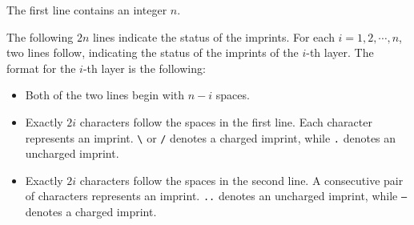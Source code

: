 The first line contains an integer $n$.

The following $2n$ lines indicate the status of the imprints.
For each $i = 1,2,\cdots,n$, two lines follow, indicating the status of the imprints of the $i$-th layer.
The format for the $i$-th layer is the following:

\begin{itemize}
\item Both of the two lines begin with $n-i$ spaces.
\item Exactly $2i$ characters follow the spaces in the first line. Each character represents an imprint. \texttt{\textbackslash} or \texttt{/} denotes a charged imprint, while \texttt{.} denotes an uncharged imprint.
\item Exactly $2i$ characters follow the spaces in the second line. A consecutive pair of characters represents an imprint. \texttt{..} denotes an uncharged imprint, while \texttt{--} denotes a charged imprint.
\end{itemize}